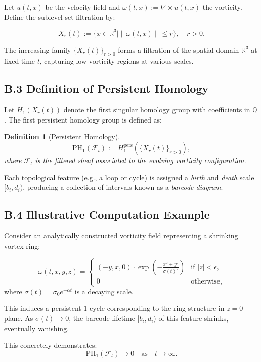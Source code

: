 \documentclass[11pt]{article}
\newtheorem{definition}[theorem]{Definition}
\begin{document}
Let $u(t,x)$ be the velocity field and $\omega(t,x) := \nabla \times u(t,x)$ the vorticity. Define the sublevel set filtration by:

\[
X_r(t) := \{ x \in \mathbb{R}^3 \mid \| \omega(t,x) \| \leq r \}, \quad r > 0.
\]

The increasing family $\{ X_r(t) \}_{r > 0}$ forms a filtration of the spatial domain $\mathbb{R}^3$ at fixed time $t$, capturing low-vorticity regions at various scales.

\subsection{B.3 Definition of Persistent Homology}

Let $H_1(X_r(t))$ denote the first singular homology group with coefficients in $\mathbb{Q}$. The first persistent homology group is defined as:

\begin{definition}[Persistent Homology]
\[
\mathrm{PH}_1(\mathcal{F}_t) := H_1^{\mathrm{pers}} \left( \{ X_r(t) \}_{r > 0} \right),
\]
where $\mathcal{F}_t$ is the filtered sheaf associated to the evolving vorticity configuration.
\end{definition}

Each topological feature (e.g., a loop or cycle) is assigned a \emph{birth} and \emph{death} scale $[b_i, d_i)$, producing a collection of intervals known as a \emph{barcode diagram}.

\subsection{B.4 Illustrative Computation Example}

Consider an analytically constructed vorticity field representing a shrinking vortex ring:

\[
\omega(t, x, y, z) = 
\begin{cases}
(-y, x, 0) \cdot \exp\left( -\frac{x^2 + y^2}{\sigma(t)^2} \right) & \text{if } |z| < \epsilon, \\
0 & \text{otherwise},
\end{cases}
\]
where $\sigma(t) = \sigma_0 e^{-\alpha t}$ is a decaying scale.

This induces a persistent $1$-cycle corresponding to the ring structure in $z=0$ plane. As $\sigma(t) \to 0$, the barcode lifetime $[b_i, d_i)$ of this feature shrinks, eventually vanishing.

This concretely demonstrates:
\[
\mathrm{PH}_1(\mathcal{F}_t) \to 0 \quad \text{as} \quad t \to \infty.
\]
\end{document}
